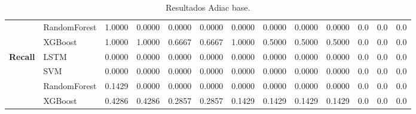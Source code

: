\begin{table}[h]
\begin{adjustbox}{max width=15cm}
\begin{tabular}{|c|l|r|r|r|r|r|r|r|r|r|r|r|}
			& RandomForest &  1.0000 &  0.0000 &  0.0000 &  0.0000 &  0.0000 &  0.0000 &  0.0000 &  0.0000 &  0.0 &  0.0 &  0.0 \\
			& XGBoost &  1.0000 &  1.0000 &  0.6667 &  0.6667 &  1.0000 &  0.5000 &  0.5000 &  0.5000 &  0.0 &  0.0 &  0.0 \\
			\hline
			\textbf{Recall} & LSTM &  0.0000 &  0.0000 &  0.0000 &  0.0000 &  0.0000 &  0.0000 &  0.0000 &  0.0000 &  0.0 &  0.0 &  0.0 \\
			& SVM &  0.0000 &  0.0000 &  0.0000 &  0.0000 &  0.0000 &  0.0000 &  0.0000 &  0.0000 &  0.0 &  0.0 &  0.0 \\
			& RandomForest &  0.1429 &  0.0000 &  0.0000 &  0.0000 &  0.0000 &  0.0000 &  0.0000 &  0.0000 &  0.0 &  0.0 &  0.0 \\
			& XGBoost &  0.4286 &  0.4286 &  0.2857 &  0.2857 &  0.1429 &  0.1429 &  0.1429 &  0.1429 &  0.0 &  0.0 &  0.0 \\
			\hline
		\end{tabular}
	\end{adjustbox}
	\caption{Resultados Adiac base.}
	\label{tab:Adiac_base}
\end{table}
\newpage
